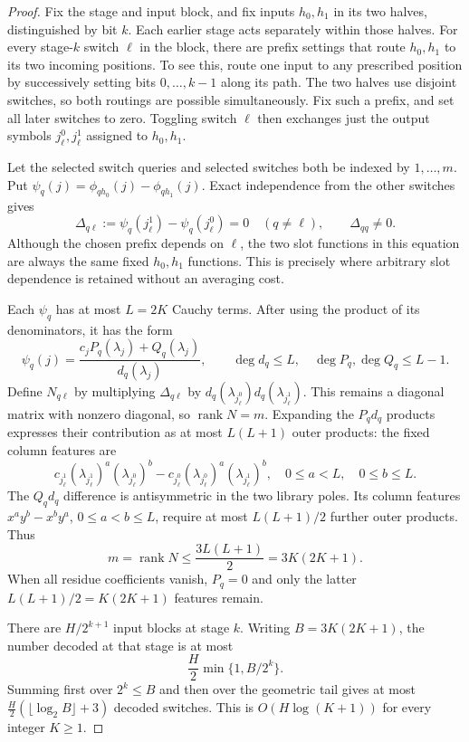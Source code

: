 \documentclass[11pt]{article}
\begin{document}
\begin{proof}
Fix the stage and input block, and fix inputs $h_0,h_1$ in its two
halves, distinguished by bit $k$. Each earlier stage acts separately
within those halves. For every stage-$k$ switch $\ell$ in the block,
there are prefix settings that route $h_0,h_1$ to its two incoming
positions. To see this, route one input to any prescribed position by
successively setting bits $0,\ldots,k-1$ along its path. The two halves
use disjoint switches, so both routings are possible simultaneously.
Fix such a prefix, and set all later switches to zero. Toggling switch
$\ell$ then exchanges just the output symbols $j_\ell^0,j_\ell^1$
assigned to $h_0,h_1$.

Let the selected switch queries and selected switches both be indexed
by $1,\ldots,m$. Put
$\psi_q(j)=\phi_{q h_0}(j)-\phi_{q h_1}(j)$. Exact independence from
the other switches gives
\[
 \Delta_{q\ell}
 :=\psi_q(j_\ell^1)-\psi_q(j_\ell^0)
 =0\quad(q\ne\ell),\qquad
 \Delta_{qq}\ne0.
\]
Although the chosen prefix depends on $\ell$, the two slot functions
in this equation are always the same fixed $h_0,h_1$ functions.
This is precisely where arbitrary slot dependence is retained without
an averaging cost.

Each $\psi_q$ has at most $L=2K$ Cauchy terms. After using the product
of its denominators, it has the form
\[
 \psi_q(j)=\frac{c_jP_q(\lambda_j)+Q_q(\lambda_j)}{d_q(\lambda_j)},
 \qquad
 \deg d_q\leq L,\quad \deg P_q,\deg Q_q\leq L-1.
\]
Define $N_{q\ell}$ by multiplying $\Delta_{q\ell}$ by
$d_q(\lambda_{j_\ell^0})d_q(\lambda_{j_\ell^1})$.
This remains a diagonal matrix with nonzero diagonal, so
$\operatorname{rank}N=m$.
Expanding the $P_qd_q$ products expresses their contribution as at most
$L(L+1)$ outer products: the fixed column features are
\[
 c_{j_\ell^1}(\lambda_{j_\ell^1})^a(\lambda_{j_\ell^0})^b
 -
 c_{j_\ell^0}(\lambda_{j_\ell^0})^a(\lambda_{j_\ell^1})^b,
 \quad 0\leq a<L,\quad 0\leq b\leq L.
\]
The $Q_qd_q$ difference is antisymmetric in the two library poles.
Its column features
$x^ay^b-x^by^a$, $0\leq a<b\leq L$, require at most
$L(L+1)/2$ further outer products. Thus
\[
 m=\operatorname{rank}N\leq\frac{3L(L+1)}2=3K(2K+1).
\]
When all residue coefficients vanish, $P_q=0$ and only the latter
$L(L+1)/2=K(2K+1)$ features remain.

There are $H/2^{k+1}$ input blocks at stage $k$. Writing
$B=3K(2K+1)$, the number decoded at that stage is at most
\[
 \frac H2\min\{1,B/2^k\}.
\]
Summing first over $2^k\leq B$ and then over the geometric tail gives
at most $\frac H2(\lfloor\log_2 B\rfloor+3)$ decoded switches. This is
$O(H\log(K+1))$ for every integer $K\geq1$.
\end{proof}
\end{document}
